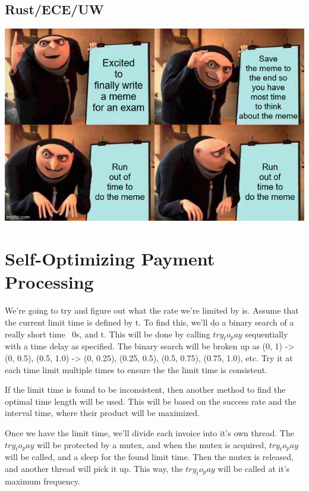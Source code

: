 \documentclass[12pt]{article}
\begin{document}
\subsection{Rust/ECE/UW}
\includegraphics[scale=0.75]{meme}

\pagebreak

\section{Self-Optimizing Payment Processing}

We're going to try and figure out what the rate we're limited by is.
Assume that the current limit time is defined by t.
To find this, we'll do a binary search of a really short time ~0s, and t.
This will be done by calling \(try_to_pay\) sequentially with a time delay as specified.
The binary search will be broken up as (0, 1) -> (0, 0.5), (0.5, 1.0) -> (0, 0.25), (0.25, 0.5), (0.5, 0.75), (0.75, 1.0), etc.
Try it at each time limit multiple times to ensure the the limit time is consistent.

If the limit time is found to be inconsistent, then another method to find the optimal time length will be used.
This will be based on the success rate and the interval time, where their product will be maximized.

Once we have the limit time, we'll divide each invoice into it's own thread.
The \(try_to_pay\) will be protected by a mutex, and when the mutex is acquired, \(try_to_pay\) will be called, and a sleep for the found limit time.
Then the mutex is released, and another thread will pick it up.
This way, the \(try_to_pay\) will be called at it's maximum frequency.
\end{document}
